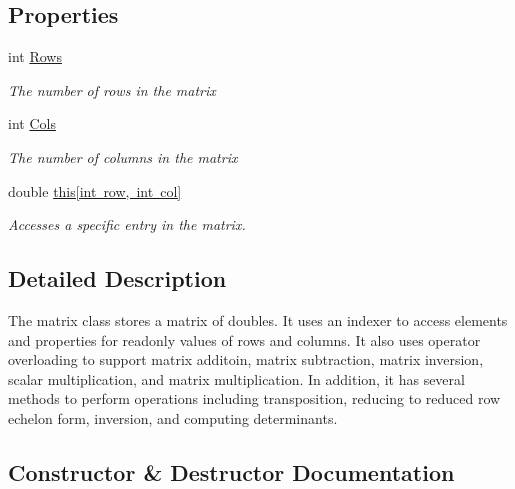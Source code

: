 \subsection*{Properties}
\begin{DoxyCompactItemize}
\item 
int \mbox{\hyperlink{class_matrix_demo_1_1_r_t_w_1_1_matrix_a9596bae43484cf8c21729237297b4744}{Rows}}
\begin{DoxyCompactList}\small\item\em The number of rows in the matrix \end{DoxyCompactList}\item 
int \mbox{\hyperlink{class_matrix_demo_1_1_r_t_w_1_1_matrix_a7b412909ff1b6c6b9c9af57314dff52b}{Cols}}
\begin{DoxyCompactList}\small\item\em The number of columns in the matrix \end{DoxyCompactList}\item 
double \mbox{\hyperlink{class_matrix_demo_1_1_r_t_w_1_1_matrix_aa908f44fc8fd669347ba6a4833406f66}{this\mbox{[}int row, int col\mbox{]}}}
\begin{DoxyCompactList}\small\item\em Accesses a specific entry in the matrix. \end{DoxyCompactList}\end{DoxyCompactItemize}


\subsection{Detailed Description}
The matrix class stores a matrix of doubles. It uses an indexer to access elements and properties for readonly values of rows and columns. It also uses operator overloading to support matrix additoin, matrix subtraction, matrix inversion, scalar multiplication, and matrix multiplication. In addition, it has several methods to perform operations including transposition, reducing to reduced row echelon form, inversion, and computing determinants. 



\subsection{Constructor \& Destructor Documentation}
\mbox{\label{class_matrix_demo_1_1_r_t_w_1_1_matrix_a8c22efc901ad89be3078a180a7ac15d0}} 
